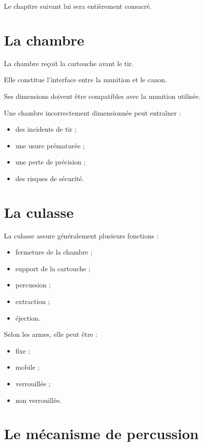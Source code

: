 Le chapitre suivant lui sera entièrement consacré.

\section{La chambre}

La chambre reçoit la cartouche avant le tir.

Elle constitue l'interface entre la munition et le canon.

Ses dimensions doivent être compatibles avec la munition utilisée.

Une chambre incorrectement dimensionnée peut entraîner :

\begin{itemize}
    \item des incidents de tir ;
    \item une usure prématurée ;
    \item une perte de précision ;
    \item des risques de sécurité.
\end{itemize}

\section{La culasse}

La culasse assure généralement plusieurs fonctions :

\begin{itemize}
    \item fermeture de la chambre ;
    \item support de la cartouche ;
    \item percussion ;
    \item extraction ;
    \item éjection.
\end{itemize}

Selon les armes, elle peut être :

\begin{itemize}
    \item fixe ;
    \item mobile ;
    \item verrouillée ;
    \item non verrouillée.
\end{itemize}

\section{Le mécanisme de percussion}

